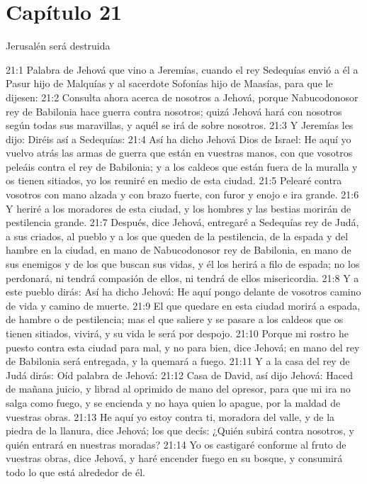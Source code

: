 \section*{Capítulo 21 }
Jerusalén será destruida 
 
21:1 Palabra de Jehová que vino a Jeremías, cuando el rey Sedequías envió a él a Pasur hijo de Malquías y al sacerdote Sofonías hijo de Maasías, para que le dijesen: 
21:2 Consulta ahora acerca de nosotros a Jehová, porque Nabucodonosor rey de Babilonia hace guerra contra nosotros; quizá Jehová hará con nosotros según todas sus maravillas, y aquél se irá de sobre nosotros. 
21:3 Y Jeremías les dijo: Diréis así a Sedequías: 
21:4 Así ha dicho Jehová Dios de Israel: He aquí yo vuelvo atrás las armas de guerra que están en vuestras manos, con que vosotros peleáis contra el rey de Babilonia; y a los caldeos que están fuera de la muralla y os tienen sitiados, yo los reuniré en medio de esta ciudad. 
21:5 Pelearé contra vosotros con mano alzada y con brazo fuerte, con furor y enojo e ira grande. 
21:6 Y heriré a los moradores de esta ciudad, y los hombres y las bestias morirán de pestilencia grande. 
21:7 Después, dice Jehová, entregaré a Sedequías rey de Judá, a sus criados, al pueblo y a los que queden de la pestilencia, de la espada y del hambre en la ciudad, en mano de Nabucodonosor rey de Babilonia, en mano de sus enemigos y de los que buscan sus vidas, y él los herirá a filo de espada; no los perdonará, ni tendrá compasión de ellos, ni tendrá de ellos misericordia. 
21:8 Y a este pueblo dirás: Así ha dicho Jehová: He aquí pongo delante de vosotros camino de vida y camino de muerte. 
21:9 El que quedare en esta ciudad morirá a espada, de hambre o de pestilencia; mas el que saliere y se pasare a los caldeos que os tienen sitiados, vivirá, y su vida le será por despojo. 
21:10 Porque mi rostro he puesto contra esta ciudad para mal, y no para bien, dice Jehová; en mano del rey de Babilonia será entregada, y la quemará a fuego. 
21:11 Y a la casa del rey de Judá dirás: Oíd palabra de Jehová: 
21:12 Casa de David, así dijo Jehová: Haced de mañana juicio, y librad al oprimido de mano del opresor, para que mi ira no salga como fuego, y se encienda y no haya quien lo apague, por la maldad de vuestras obras. 
21:13 He aquí yo estoy contra ti, moradora del valle, y de la piedra de la llanura, dice Jehová; los que decís: ¿Quién subirá contra nosotros, y quién entrará en nuestras moradas? 
21:14 Yo os castigaré conforme al fruto de vuestras obras, dice Jehová, y haré encender fuego en su bosque, y consumirá todo lo que está alrededor de él. 

